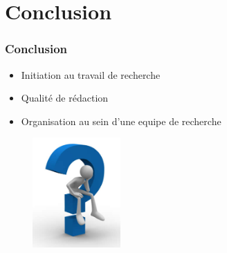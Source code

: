 \documentclass{beamer}
\begin{document}

\section{Conclusion}

\begin{frame}\frametitle{Conclusion}

	\begin{itemize}
				\item Initiation au travail de recherche\newline
				\item Qualité de rédaction\newline
				\item Organisation au sein d'une equipe de recherche\newline
	\end{itemize}

\end{frame}

\begin{frame}

	\begin{figure}[h]
	\centering
			\includegraphics[width=0.30\textwidth]{question.jpg}
	\label{fig:question}
	\end{figure}
	
\end{frame}
\end{document}
